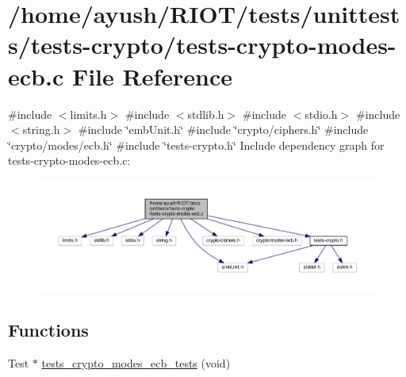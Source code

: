 \hypertarget{tests-crypto-modes-ecb_8c}{}\section{/home/ayush/\+R\+I\+O\+T/tests/unittests/tests-\/crypto/tests-\/crypto-\/modes-\/ecb.c File Reference}
\label{tests-crypto-modes-ecb_8c}
{\ttfamily \#include $<$limits.\+h$>$}\newline
{\ttfamily \#include $<$stdlib.\+h$>$}\newline
{\ttfamily \#include $<$stdio.\+h$>$}\newline
{\ttfamily \#include $<$string.\+h$>$}\newline
{\ttfamily \#include \char`\"{}emb\+Unit.\+h\char`\"{}}\newline
{\ttfamily \#include \char`\"{}crypto/ciphers.\+h\char`\"{}}\newline
{\ttfamily \#include \char`\"{}crypto/modes/ecb.\+h\char`\"{}}\newline
{\ttfamily \#include \char`\"{}tests-\/crypto.\+h\char`\"{}}\newline
Include dependency graph for tests-\/crypto-\/modes-\/ecb.c\+:
\nopagebreak
\begin{figure}[H]
\begin{center}
\leavevmode
\includegraphics[width=350pt]{tests-crypto-modes-ecb_8c__incl}
\end{center}
\end{figure}
\subsection*{Functions}
\begin{DoxyCompactItemize}
\item 
Test $\ast$ \hyperlink{group__unittests_ga76fd240d06e873ffb3cd5e75c7407de8}{tests\+\_\+crypto\+\_\+modes\+\_\+ecb\+\_\+tests} (void)
\end{DoxyCompactItemize}
